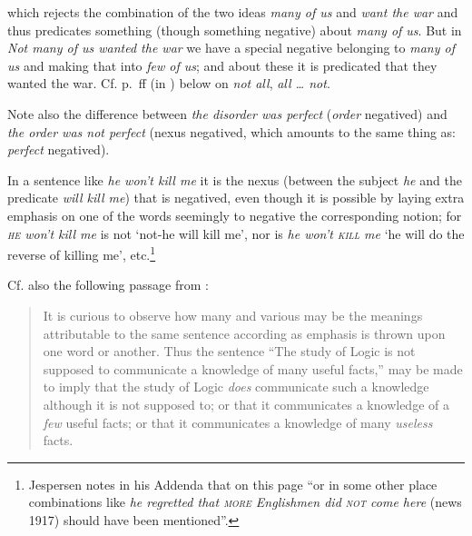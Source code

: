 \noindent which rejects the combination of the two ideas \textit{many of us} and \textit{want the war} and thus predicates something (though something negative) about \textit{many of us}. But in \textit{Not many of us wanted the war} we have a special negative belonging to \textit{many of us} and making that into \textit{few of us}; and about these it is predicated that they wanted the war. Cf. p.~\pageref{08-not-all}ff (in ) below %
on \textit{not all}, \textit{all {\dots} not}.

Note also the difference between \textit{the disorder was perfect} (\textit{order} negatived) and \textit{the order was not perfect} (nexus negatived, which amounts to the same thing as: \textit{perfect} negatived).

In a sentence like \textit{he won't kill me} it is the nexus (between the subject \textit{he} and the predicate \textit{will kill me}) that is negatived, even though it is possible by laying extra emphasis on one of the words seemingly to negative the corresponding notion; for \textit{\textsc{he} won't kill me} is not `not-he will kill me', nor is \textit{he won't \textsc{kill} me} `he will do the reverse of killing me', etc.\footnote{Jespersen notes in his Addenda that on this page ``or in some other place combinations like \textit{he regretted that \textsc{more} Englishmen did \textsc{not} come here} (news 1917) should have been mentioned''. \eds} %

Cf. also the following passage from \citet[\href{https://archive.org/details/elementarylesson00jevo/page/174/mode/2up?q=\%22curious+to+observe\%22&view=theater}{175}]{jevons1893elementary}:

\begin{quote}
It is curious to observe how many and various may be the meanings attributable to the same sentence according as emphasis is thrown upon one word or another. Thus the sentence ``The study of Logic is not supposed to communicate a knowledge of many useful facts,'' may be made to imply that the study of Logic \textit{does} communicate such a knowledge although it is not supposed to; or that it communicates a knowledge of a \textit{few} useful facts; or that it communicates a knowledge of many \textit{useless} facts. 
\end{quote}

